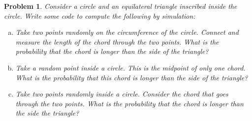 \documentclass[12pt, letterpaper]{amsart}
\numberwithin{equation}{section} %
\newtheorem{problem}{Problem}
\theoremstyle{definition}
\theoremstyle{remark}
\begin{document}
\begin{problem}
Consider a circle and an equilateral triangle inscribed inside the circle. Write some code to compute the following by simulation:
\begin{enumerate}[a.]
\item Take two points randomly on the circumference of the circle. Connect and measure the length of the chord through the two points. What is the probability that the chord is longer than the side of the triangle?
\item Take  a random  point  inside  a  circle.  This  is  the  midpoint  of  only  one  chord.  What  is  the probability that this chord is longer than the side of the triangle?
\item Take two points randomly inside a circle. Consider the chord that goes through the two points. What is the probability that the chord is longer than the side the triangle?
\end{enumerate}
\end{problem}
\end{document}
